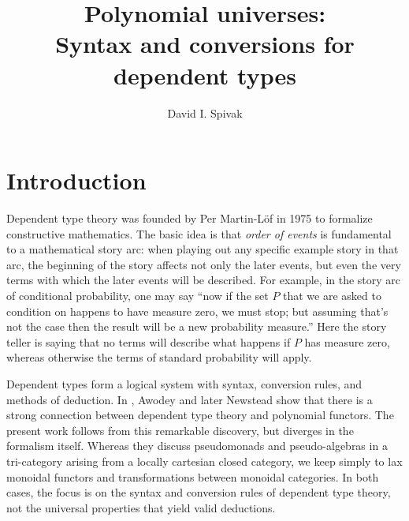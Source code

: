 \documentclass[11pt, one side, article]{memoir}
\theoremstyle{definition}
\theoremstyle{plain}
\newcommand{\0}{\textsf{0}}
\newcommand{\1}{\tn{\textsf{1}}}
\begin{document}
\title{Polynomial universes:\\Syntax and conversions for dependent types}

\author{David I. Spivak}

\date{\vspace{-.2in}}

\maketitle

\begin{abstract}
\end{abstract}


\chapter{Introduction}



Dependent type theory \cite{martin-lof1975intuitionistic} was founded by Per Martin-L\"{o}f in 1975 to formalize constructive mathematics. The basic idea is that \emph{order of events} is fundamental to a mathematical story arc: when playing out any specific example story in that arc, the beginning of the story affects not only the later events, but even the very terms with which the later events will be described. For example, in the story arc of conditional probability, one may say ``now if the set $P$ that we are asked to condition on happens to have measure zero, we must stop; but assuming that's not the case then the result will be a new probability measure.'' Here the story teller is saying that no terms will describe what happens if $P$ has measure zero, whereas otherwise the terms of standard probability will apply.

Dependent types form a logical system with syntax, conversion rules, and methods of deduction. In \cite{awodey2014natural,awodey2018polynomial}, Awodey and later Newstead show that there is a strong connection between dependent type theory and polynomial functors. The present work follows from this remarkable discovery, but diverges in the formalism itself. Whereas they discuss pseudomonads and pseudo-algebras in a tri-category arising from a locally cartesian closed category, we keep simply to lax monoidal functors and transformations between monoidal categories. In both cases, the focus is on the syntax and conversion rules of dependent type theory, not the universal properties that yield valid deductions.
\end{document}
